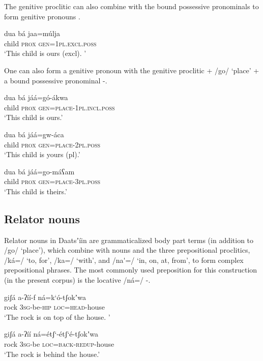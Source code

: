 \documentclass[output=paper]{langsci/langscibook}
\begin{document}
The genitive proclitic can also combine with the bound possessive pronominals to form genitive pronouns .

\ea\label{ex:ahlandc:59}
\gll
dua  b\'{a}  jaa=m\'{u}lja \\
child  \textsc{prox} \textsc{gen=1pl.excl.poss}  \\
\glt
‘This child is ours (excl). ’
\z

One can also form a genitive pronoun with the genitive proclitic + /go/ ‘place’ + a bound possessive pronominal -.

\ea\label{ex:ahlandc:60}
\gll
dua   b\'{a}       j\'{a}\'{a}=g\'{o}-\'{a}kwa \\
child \textsc{prox}  \textsc{gen}\textsc{=place-1pl.incl.poss} \\
\glt
‘This child is ours.’
\z

\ea\label{ex:ahlandc:61}
\gll 
dua   b\'{a}       j\'{a}\'{a}=gw-\'{a}ca \\
child \textsc{prox} \textsc{gen}\textsc{=place-2pl.poss} \\
\glt
‘This child is yours (pl).’
\z

\ea\label{ex:ahlandc:62}
\gll
dua   b\'{a}       j\'{a}\'{a}=go-m\'{a}ʕam \\
child \textsc{prox} \textsc{gen}\textsc{=place-3pl.poss}  \\
\glt
‘This child is theirs.’
\z

\subsection{Relator nouns}\label{sec:ahlandc:10.2}

Relator nouns in Daatsʼ\'{i}in are grammaticalized body part terms (in addition to /go/ ‘place’), which combine with nouns and the three prepositional proclitics, /k\'{a}=/ ‘to, for’, /ka=/ ‘with’, and /na\'{ }=/ ‘in, on, at, from’, to form complex prepositional phrases. The most commonly used preposition for this construction (in the present corpus) is the locative /n\'{a}=/ -. 

\ea\label{ex:ahlandc:63}
\gll
giʃ\'{a}  a-ʔ\'{i}\'{i}-f    n\'{a}=k‘\'{o}-tʃokʼwa \\
rock \textsc{3sg}{}-be-\textsc{hip}  \textsc{loc}\textsc{=head}{}-house \\
\glt
‘The rock is on top of the house. ’
\z

\ea\label{ex:ahlandc:64}
\gll
giʃ\'{a}  a-ʔ\'{i}\'{i}    n\'{a}=\'{e}tʃ‘-\'{e}tʃ‘\'{e}-tʃokʼwa \\
rock   3\textsc{sg}{}-be    \textsc{loc}=\textsc{back}{}-\textsc{redup}{}-house \\
\glt
‘The rock is behind the house.’
\z
\end{document}
